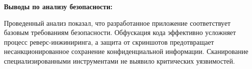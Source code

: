 \textbf{Выводы по анализу безопасности:}

Проведенный анализ показал, что разработанное приложение соответствует базовым требованиям безопасности. Обфускация кода эффективно усложняет процесс реверс-инжиниринга, а защита от скриншотов предотвращает несанкционированное сохранение конфиденциальной информации. Сканирование специализированными инструментами не выявило критических уязвимостей.
